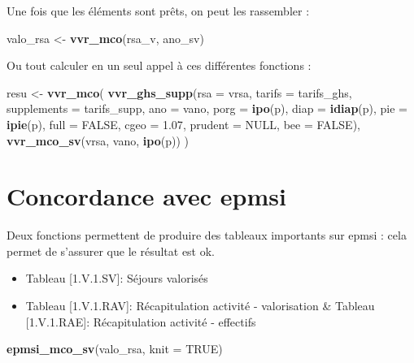 \documentclass[]{book}
\newenvironment{Shaded}{\begin{snugshade}}{\end{snugshade}}
\newcommand{\KeywordTok}[1]{\textcolor[rgb]{0.13,0.29,0.53}{\textbf{#1}}}
\newcommand{\DataTypeTok}[1]{\textcolor[rgb]{0.13,0.29,0.53}{#1}}
\newcommand{\FloatTok}[1]{\textcolor[rgb]{0.00,0.00,0.81}{#1}}
\newcommand{\StringTok}[1]{\textcolor[rgb]{0.31,0.60,0.02}{#1}}
\newcommand{\OtherTok}[1]{\textcolor[rgb]{0.56,0.35,0.01}{#1}}
\newcommand{\NormalTok}[1]{#1}
\providecommand{\tightlist}{%
  \setlength{\itemsep}{0pt}\setlength{\parskip}{0pt}}
\begin{document}
Une fois que les éléments sont prêts, on peut les rassembler :

\begin{Shaded}
\begin{Highlighting}[]
\NormalTok{valo_rsa <-}\StringTok{ }\KeywordTok{vvr_mco}\NormalTok{(rsa_v, ano_sv)}
\end{Highlighting}
\end{Shaded}

Ou tout calculer en un seul appel à ces différentes fonctions :

\begin{Shaded}
\begin{Highlighting}[]
\NormalTok{resu <-}\StringTok{ }\KeywordTok{vvr_mco}\NormalTok{(}
\KeywordTok{vvr_ghs_supp}\NormalTok{(}\DataTypeTok{rsa =}\NormalTok{ vrsa, }
             \DataTypeTok{tarifs =}\NormalTok{ tarifs_ghs, }
             \DataTypeTok{supplements =}\NormalTok{  tarifs_supp, }
             \DataTypeTok{ano =}\NormalTok{ vano, }
             \DataTypeTok{porg =} \KeywordTok{ipo}\NormalTok{(p), }
             \DataTypeTok{diap =} \KeywordTok{idiap}\NormalTok{(p), }
             \DataTypeTok{pie =} \KeywordTok{ipie}\NormalTok{(p), }
             \DataTypeTok{full =} \OtherTok{FALSE}\NormalTok{,}
             \DataTypeTok{cgeo =} \FloatTok{1.07}\NormalTok{, }
             \DataTypeTok{prudent =} \OtherTok{NULL}\NormalTok{,}
             \DataTypeTok{bee =} \OtherTok{FALSE}\NormalTok{),}
\KeywordTok{vvr_mco_sv}\NormalTok{(vrsa, vano, }\KeywordTok{ipo}\NormalTok{(p))}
\NormalTok{)}
\end{Highlighting}
\end{Shaded}

\section{Concordance avec epmsi}\label{concordance-avec-epmsi}

Deux fonctions permettent de produire des tableaux importants sur epmsi
: cela permet de s'assurer que le résultat est ok.

\begin{itemize}
\tightlist
\item
  Tableau {[}1.V.1.SV{]}: Séjours valorisés
\item
  Tableau {[}1.V.1.RAV{]}: Récapitulation activité - valorisation \&
  Tableau {[}1.V.1.RAE{]}: Récapitulation activité - effectifs
\end{itemize}

\begin{Shaded}
\begin{Highlighting}[]
\KeywordTok{epmsi_mco_sv}\NormalTok{(valo_rsa, }\DataTypeTok{knit =} \OtherTok{TRUE}\NormalTok{)}
\end{Highlighting}
\end{Shaded}
\end{document}

